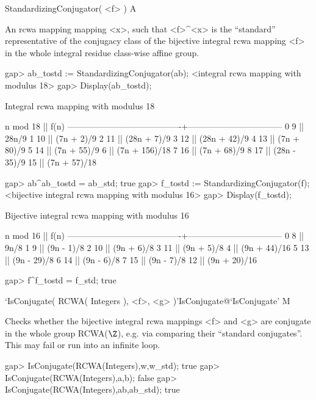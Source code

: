 \endexample

\>StandardizingConjugator( <f> ) A

An rcwa mapping mapping <x>, such that <f>^<x> is the ``standard''
representative of the conjugacy class of the bijective integral
rcwa mapping <f> in the whole integral residue class-wise affine group.

\beginexample
gap> ab_tostd := StandardizingConjugator(ab);
<integral rcwa mapping with modulus 18>
gap> Display(ab_tostd);

Integral rcwa mapping with modulus 18

               n mod 18                 ||              f(n)
----------------------------------------+---------------------------------
   0  9                                 || 28n/9
   1 10                                 || (7n + 2)/9
   2 11                                 || (28n + 7)/9
   3 12                                 || (28n + 42)/9
   4 13                                 || (7n + 80)/9
   5 14                                 || (7n + 55)/9
   6                                    || (7n + 156)/18
   7 16                                 || (7n + 68)/9
   8 17                                 || (28n - 35)/9
  15                                    || (7n + 57)/18

gap> ab^ab_tostd = ab_std;
true
gap> f_tostd := StandardizingConjugator(f);
<bijective integral rcwa mapping with modulus 16>
gap> Display(f_tostd);

Bijective integral rcwa mapping with modulus 16

               n mod 16                 ||              f(n)
----------------------------------------+---------------------------------
   0  8                                 || 9n/8
   1  9                                 || (9n - 1)/8
   2 10                                 || (9n + 6)/8
   3 11                                 || (9n + 5)/8
   4                                    || (9n + 44)/16
   5 13                                 || (9n - 29)/8
   6 14                                 || (9n - 6)/8
   7 15                                 || (9n - 7)/8
  12                                    || (9n + 20)/16

gap> f^f_tostd = f_std;
true
\endexample

\>`IsConjugate( RCWA( Integers ), <f>, <g> )'{IsConjugate}@{`IsConjugate'} M

Checks whether the bijective integral rcwa mappings <f> and <g>
are conjugate in the whole group RCWA($\Z$), e.g. via comparing
their ``standard conjugates''. 
This may fail or run into an infinite loop.

\beginexample
gap> IsConjugate(RCWA(Integers),w,w_std);
true
gap> IsConjugate(RCWA(Integers),a,b);
false
gap> IsConjugate(RCWA(Integers),ab,ab_std);
true
\endexample

